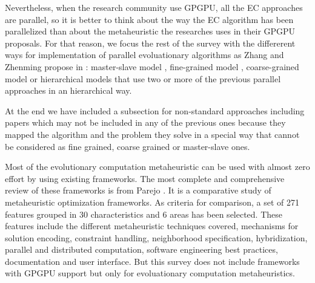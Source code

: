 \documentclass[prodmode,acmtecs]{acmsmall}
\begin{document}
Nevertheless, when the research community use GPGPU, all the EC approaches are parallel, so it is better to think about the way the EC algorithm has been parallelized than about the metaheuristic the researches uses in their GPGPU proposals. For that reason, we focus the rest of the survey with the differerent ways for implementation of parallel evoluationary algorithms as Zhang and Zhenming propose in \cite{ZhangImplementationMasterSlave}: master-slave model \cite{man-leung-wong-parallel-2005}, fine-grained model \cite{jian_ming_li_efficient_2007}, coarse-grained model \cite{Maitre:2009:CGP:1569901_1570089} \cite{pospichalParallelGeneticAlgorithOnCUDA2010} or hierarchical models  \cite{DBLP:conf/gecco/PospichalMOSJ11} that use two or more of the previous parallel approaches in an hierarchical way. 
 
At the end we have included a subsection for non-standard approaches \cite{DBLP:conf/gecco/PospichalMOSJ11} including  papers which may not be included in any of the previous ones because they mapped the algorithm and the problem they solve in a special way that cannot be considered as fine grained, coarse grained or master-slave ones.

 
Most of the evolutionary computation metaheuristic can be used with almost zero effort by using existing frameworks. The most complete and comprehensive review of these frameworks is from Parejo \cite{springerlink:10.1007/s00500-011-0754-8}. It is a comparative study of metaheuristic optimization frameworks. As criteria for comparison, a set of 271 features grouped in 30 characteristics and 6 areas has been selected. These features include the different metaheuristic techniques covered, mechanisms for solution encoding, constraint handling, neighborhood specification, hybridization, parallel and distributed computation, software engineering best practices, documentation and user interface. But this survey does not include frameworks with GPGPU support but only for evoluationary computation metaheuristics. 

\end{document}
